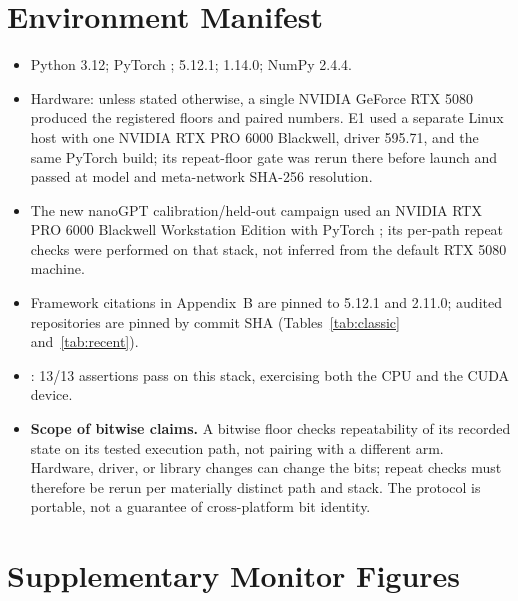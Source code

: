 \section{Environment Manifest}
\label{sec:env}

\begin{itemize}\itemsep2pt
\item Python 3.12; PyTorch ; 
5.12.1;  1.14.0; NumPy 2.4.4.
\item Hardware: unless stated otherwise, a single NVIDIA GeForce RTX 5080
produced the registered floors and paired numbers. E1 used a separate Linux
host with one NVIDIA RTX PRO 6000 Blackwell, driver 595.71, and the same
PyTorch  build; its repeat-floor gate was rerun there
before launch and passed at model and meta-network SHA-256 resolution.
\item The new nanoGPT calibration/held-out campaign used an NVIDIA RTX PRO
6000 Blackwell Workstation Edition with PyTorch ;
its per-path repeat checks were performed on that stack, not inferred from
the default RTX 5080 machine.
\item Framework citations in Appendix~B are pinned to 
5.12.1 and  2.11.0; audited repositories are pinned by commit
SHA (Tables~\ref{tab:classic} and~\ref{tab:recent}).
\item {}: 13/13 assertions pass on this
stack, exercising both the CPU and the CUDA device.
\item \textbf{Scope of bitwise claims.} A bitwise floor checks repeatability
of its recorded state on its tested execution path, not pairing with a
different arm. Hardware, driver, or library changes can change the bits;
repeat checks must therefore be rerun per materially distinct path and stack.
The protocol is portable, not a guarantee of cross-platform bit identity.
\end{itemize}

\section{Supplementary Monitor Figures}
\label{sec:monitorfigs}


